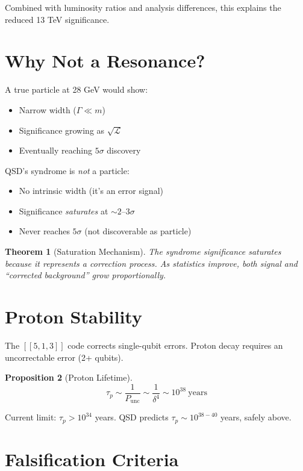 \documentclass[11pt,a4paper]{article}
\newtheorem{theorem}{Theorem}[section]
\newtheorem{proposition}[theorem]{Proposition}
\theoremstyle{definition}
\newcommand{\dgeo}{\delta}
\begin{document}
Combined with luminosity ratios and analysis differences, this explains the reduced 13 TeV significance.

\section{Why Not a Resonance?}

A true particle at 28 GeV would show:
\begin{itemize}[nosep]
    \item Narrow width ($\Gamma \ll m$)
    \item Significance growing as $\sqrt{\mathcal{L}}$
    \item Eventually reaching $5\sigma$ discovery
\end{itemize}

QSD's syndrome is \emph{not} a particle:
\begin{itemize}[nosep]
    \item No intrinsic width (it's an error signal)
    \item Significance \emph{saturates} at $\sim 2$--$3\sigma$
    \item Never reaches $5\sigma$ (not discoverable as particle)
\end{itemize}

\begin{theorem}[Saturation Mechanism]
The syndrome significance saturates because it represents a \emph{correction} process. As statistics improve, both signal and ``corrected background'' grow proportionally.
\end{theorem}

\section{Proton Stability}

The $[[5,1,3]]$ code corrects single-qubit errors. Proton decay requires an uncorrectable error (2+ qubits).

\begin{proposition}[Proton Lifetime]
\begin{equation}
\tau_p \sim \frac{1}{P_{\text{unc}}} \sim \frac{1}{\dgeo^4} \sim 10^{38}~\text{years}
\end{equation}
\end{proposition}

Current limit: $\tau_p > 10^{34}$ years. QSD predicts $\tau_p \sim 10^{38-40}$ years, safely above.

\section{Falsification Criteria}
\end{document}
